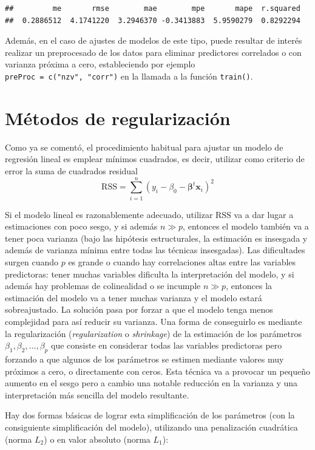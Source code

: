 \documentclass[
  spanish,
]{book}
\theoremstyle{break}
\theoremstyle{definition}
\theoremstyle{definition}
\theoremstyle{definition}
\theoremstyle{definition}
\theoremstyle{remark}
\begin{document}
\begin{verbatim}
##         me       rmse        mae        mpe       mape  r.squared 
##  0.2886512  4.1741220  3.2946370 -0.3413883  5.9590279  0.8292294
\end{verbatim}

Además, en el caso de ajustes de modelos de este tipo, puede resultar de interés realizar un preprocesado de los datos para eliminar predictores correlados o con varianza próxima a cero,
estableciendo por ejemplo \texttt{preProc\ =\ c("nzv",\ "corr")} en la llamada a la función \texttt{train()}.

\hypertarget{shrinkage}{%
\section{Métodos de regularización}\label{shrinkage}}

Como ya se comentó, el procedimiento habitual para ajustar un modelo de regresión lineal es emplear mínimos cuadrados, es decir, utilizar como criterio de error la suma de cuadrados residual
\[\mbox{RSS} = \sum\limits_{i=1}^{n}\left(  y_{i} - \beta_0 - \boldsymbol{\beta}^t \mathbf{x}_{i} \right)^{2}\]

Si el modelo lineal es razonablemente adecuado, utilizar \(\mbox{RSS}\) va a dar lugar a estimaciones con poco sesgo, y si además \(n\gg p\), entonces el modelo también va a tener poca varianza (bajo las hipótesis estructurales, la estimación es insesgada y además de varianza mínima entre todas las técnicas insesgadas).
Las dificultades surgen cuando \(p\) es grande o cuando hay correlaciones altas entre las variables predictoras: tener muchas variables dificulta la interpretación del modelo, y si además hay problemas de colinealidad o se incumple \(n\gg p\), entonces la estimación del modelo va a tener muchas varianza y el modelo estará sobreajustado.
La solución pasa por forzar a que el modelo tenga menos complejidad para así reducir su varianza.
Una forma de conseguirlo es mediante la regularización (\emph{regularization} o \emph{shrinkage}) de la estimación de los parámetros \(\beta_1, \beta_2,\ldots, \beta_p\) que consiste en considerar todas las variables predictoras pero forzando a que algunos de los parámetros se estimen mediante valores muy próximos a cero, o directamente con ceros.
Esta técnica va a provocar un pequeño aumento en el sesgo pero a cambio una notable reducción en la varianza y una interpretación más sencilla del modelo resultante.

Hay dos formas básicas de lograr esta simplificación de los parámetros (con la consiguiente simplificación del modelo), utilizando una penalización cuadrática (norma \(L_2\)) o en valor absoluto (norma \(L_1\)):
\end{document}
